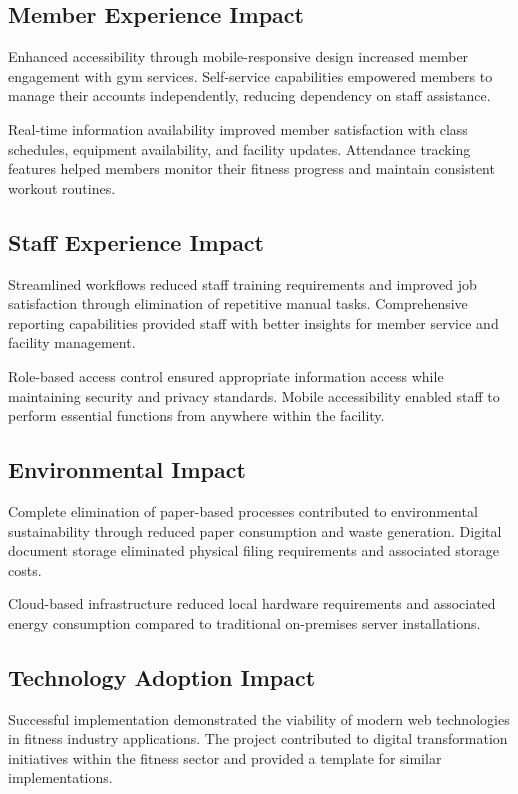 \documentclass[12pt,a4paper]{report}
\begin{document}
\subsection{Member Experience Impact}

Enhanced accessibility through mobile-responsive design increased member engagement with gym services. Self-service capabilities empowered members to manage their accounts independently, reducing dependency on staff assistance.

Real-time information availability improved member satisfaction with class schedules, equipment availability, and facility updates. Attendance tracking features helped members monitor their fitness progress and maintain consistent workout routines.

\subsection{Staff Experience Impact}

Streamlined workflows reduced staff training requirements and improved job satisfaction through elimination of repetitive manual tasks. Comprehensive reporting capabilities provided staff with better insights for member service and facility management.

Role-based access control ensured appropriate information access while maintaining security and privacy standards. Mobile accessibility enabled staff to perform essential functions from anywhere within the facility.

\subsection{Environmental Impact}

Complete elimination of paper-based processes contributed to environmental sustainability through reduced paper consumption and waste generation. Digital document storage eliminated physical filing requirements and associated storage costs.

Cloud-based infrastructure reduced local hardware requirements and associated energy consumption compared to traditional on-premises server installations.

\subsection{Technology Adoption Impact}

Successful implementation demonstrated the viability of modern web technologies in fitness industry applications. The project contributed to digital transformation initiatives within the fitness sector and provided a template for similar implementations.
\end{document}
